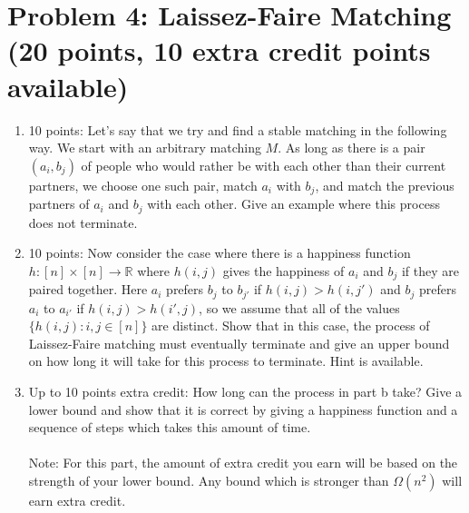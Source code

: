 \documentclass[12pt]{article}
\begin{document}
\section*{Problem 4: Laissez-Faire Matching (20 points, 10 extra credit points available)}
\begin{enumerate}
\item[(a)] 10 points: Let's say that we try and find a stable matching in the following way. We start with an arbitrary matching $M$. As long as there is a pair $(a_i,b_j)$ of people who would rather be with each other than their current partners, we choose one such pair, match $a_i$ with $b_j$, and match the previous partners of $a_i$ and $b_j$ with each other. Give an example where this process does not terminate.
\item[(b)] 10 points: Now consider the case where there is a happiness function $h: [n] \times [n] \to \mathbb{R}$ where $h(i,j)$ gives the happiness of $a_i$ and $b_j$ if they are paired together. Here $a_i$ prefers $b_j$ to $b_{j'}$ if $h(i,j) > h(i,j')$ and $b_j$ prefers $a_i$ to $a_{i'}$ if $h(i,j) > h(i',j)$, so we assume that all of the values $\{h(i,j):i,j \in [n]\}$ are distinct. Show that in this case, the process of Laissez-Faire matching must eventually terminate and give an upper bound on how long it will take for this process to terminate. Hint is available.
\item[(c)] Up to 10 points extra credit: How long can the process in part b take? Give a lower bound and show that it is correct by giving a happiness function and a sequence of steps which takes this amount of time. \\
\\
Note: For this part, the amount of extra credit you earn will be based on the strength of your lower bound. Any bound which is stronger than $\Omega(n^2)$ will earn extra credit.
\end{enumerate}
\end{document}
